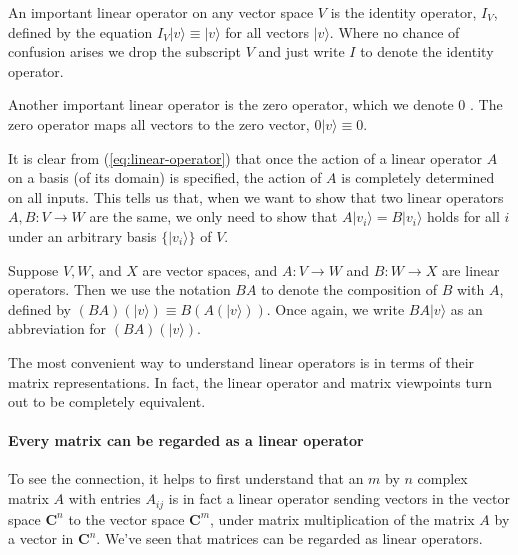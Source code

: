 \documentclass[
	11pt, %
	fleqn, %
	a4paper, %
]{LegrandOrangeBook}
\begin{document}
\begin{example}
    An important linear operator on any vector space $V$ is the identity operator, $I_{V}$, defined by the equation $I_{V}|v\rangle \equiv|v\rangle$ for all vectors $|v\rangle$. Where no chance of confusion arises we drop the subscript $V$ and just write $I$ to denote the identity operator. 
\end{example}

\begin{example}
    Another important linear operator is the zero operator, which we denote 0 . The zero operator maps all vectors to the zero vector, $0|v\rangle \equiv 0$. 
\end{example}

It is clear from (\ref{eq:linear-operator}) that once the action of a linear operator $A$ on a basis (of its domain) is specified, the action of $A$ is completely determined on all inputs. This tells us that, when we want to show that two linear operators $A,B:V \rightarrow W$ are the same, we only need to show that $A |v_{i}\rangle = B|v_{i}\rangle$ holds for all $i$ under an arbitrary basis $\{|v_{i}\rangle\}$ of $V.$

Suppose $V, W$, and $X$ are vector spaces, and $A: V \rightarrow W$ and $B: W \rightarrow X$ are linear operators. Then we use the notation $B A$ to denote the composition of $B$ with $A$, defined by $(B A)(|v\rangle) \equiv B(A(|v\rangle))$. Once again, we write $B A|v\rangle$ as an abbreviation for $(B A)(|v\rangle)$.

The most convenient way to understand linear operators is in terms of their matrix representations. In fact, the linear operator and matrix viewpoints turn out to be completely equivalent. 

\paragraph{Every matrix can be regarded as a linear operator}
To see the connection, it helps to first understand that an $m$ by $n$ complex matrix $A$ with entries $A_{i j}$ is in fact a linear operator sending vectors in the vector space $\mathbf{C}^{n}$ to the vector space $\mathbf{C}^{m}$, under matrix multiplication of the matrix $A$ by a vector in $\mathbf{C}^{n}$. We've seen that matrices can be regarded as linear operators.
\end{document}
